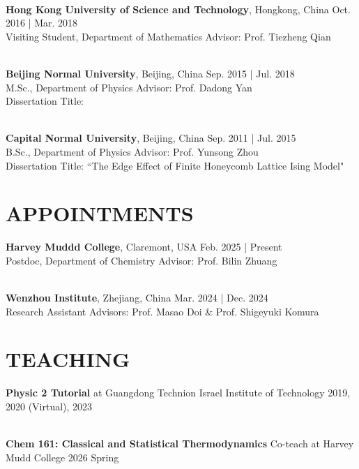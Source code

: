 \documentclass[a4paper,10pt]{extarticle}
\begin{document}
\noindent\\
\textbf{Hong Kong University of Science and Technology}, Hongkong, China \hfill Oct. 2016 | Mar. 2018\\ %
Visiting Student, Department of Mathematics \hfill Advisor: Prof. Tiezheng Qian 

\noindent\\
\textbf{Beijing Normal University}, Beijing, China \hfill Sep. 2015 | Jul. 2018 \\ %
M.Sc., Department of Physics \hfill Advisor: Prof. Dadong Yan 
\\Dissertation Title: 

\noindent\\
\textbf{Capital Normal University}, Beijing, China \hfill Sep. 2011 | Jul. 2015 \\ %
B.Sc., Department of Physics \hfill Advisor: Prof. Yunsong Zhou 
\vspace{0.6em}
\\ Dissertation Title: ``The Edge Effect of Finite Honeycomb Lattice Ising Model"


\section*{APPOINTMENTS}
\textbf{Harvey Muddd College}, Claremont, USA \hfill Feb. 2025 |  Present \\ %
Postdoc, Department of Chemistry \hfill Advisor: Prof. Bilin Zhuang 

\noindent\\
\textbf{Wenzhou Institute}, Zhejiang, China \hfill Mar. 2024 | Dec. 2024 \\ %
 Research Assistant \hfill Advisors: Prof. Masao Doi \& Prof. Shigeyuki Komura

\vspace{0.6em}
\section*{TEACHING}
\textbf{Physic 2 Tutorial} at Guangdong Technion Israel Institute of Technology \hfill 2019, 2020 (Virtual), 2023

\noindent\\
\textbf{Chem 161: Classical and Statistical Thermodynamics} Co-teach at Harvey Mudd College \hfill 2026 Spring

\vspace{0.6em}
\end{document}
